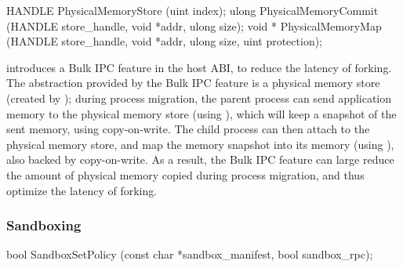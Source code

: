 \begin{paldef}
HANDLE PhysicalMemoryStore  (uint index);
ulong  PhysicalMemoryCommit (HANDLE store_handle,
                             void *addr, ulong size);
void * PhysicalMemoryMap    (HANDLE store_handle,
                             void *addr, ulong size,
                             uint protection);
\end{paldef}


\graphene{} introduces a Bulk IPC feature in the host ABI, to reduce the latency of forking.
The abstraction provided by the Bulk IPC feature
is a physical memory store (created by );
during process migration, the parent process
can send application memory to the physical memory store (using ), which will keep a snapshot of the sent memory, using copy-on-write.
The child process can then attach to the physical memory store,
and map the memory snapshot into its memory (using ), also backed by copy-on-write.
As a result, the Bulk IPC feature can large reduce the amount of physical memory copied during process migration,
and thus optimize the latency of forking.




\subsubsection*{Sandboxing}


\begin{paldef}
bool SandboxSetPolicy (const char *sandbox_manifest,
                       bool sandbox_rpc);
\end{paldef}



